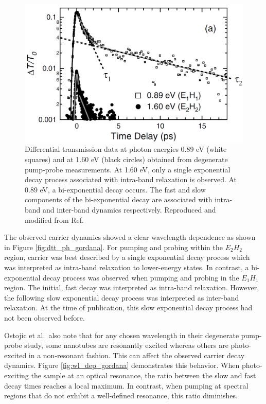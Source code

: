 \begin{figure}[ht]
	\centering
	\includegraphics[scale=0.3]{images/chapter_prior_works/dtt_gordana}
	\caption{Differential transmission data at photon energies 0.89 eV (white squares) and at 1.60 eV (black circles) obtained from degenerate pump-probe measurements. At 1.60 eV, only a single exponential decay process associated with intra-band relaxation is observed. At 0.89 eV, a bi-exponential decay occurs. The fast and slow components of the bi-exponential decay are associated with intra-band and inter-band dynamics respectively. Reproduced and modified from Ref.\ \cite{ostojic2004interband}}
	\label{fig: abs_gordana}
\end{figure}

The observed carrier dynamics showed a clear wavelength dependence as shown in Figure \ref{fig:dtt_ph_gordana}. For pumping and probing within the $E_2 H_2$ region, carrier was best described by a single exponential decay process which was interpreted as intra-band relaxation to lower-energy states. In contrast, a bi-exponential decay process was observed when pumping and probing in the $E_1 H_1$ region. The initial, fast decay was interpreted as intra-band relaxation. However, the following slow exponential decay process was interpreted as inter-band relaxation. At the time of publication, this slow exponential decay process had not been observed before.

Ostojic et al.\  also note that for any chosen wavelength in their degenerate pump-probe study, some nanotubes are resonantly excited whereas others are photo-excited in a non-resonant fashion. This can affect the observed carrier decay dynamics. Figure \ref{fig:wl_dep_gordana} demonstrates this behavior. When photo-exciting the sample at an optical resonance, the ratio between the slow and fast decay times reaches a local maximum. In contrast, when pumping at spectral regions that do not exhibit a well-defined resonance, this ratio diminishes.

